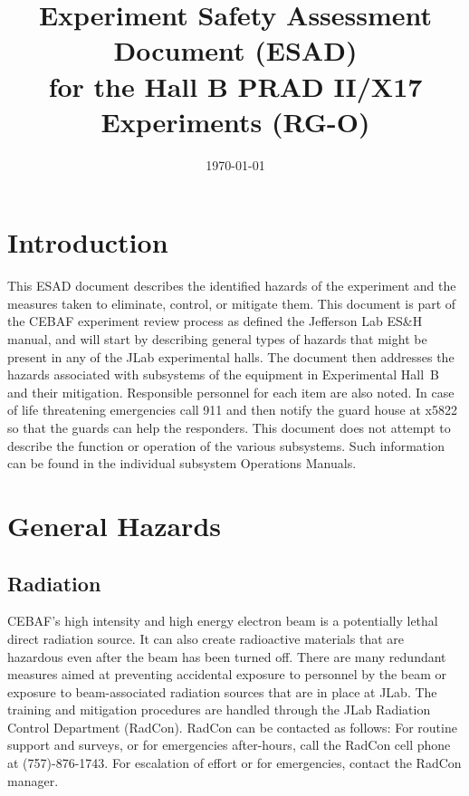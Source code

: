 \documentclass[12pt]{report}
\begin{document}
\title{Experiment Safety Assessment Document (ESAD) \\ 
  for the Hall B PRAD II/X17 Experiments (RG-O)}
\date{\today}
%
%
%
\maketitle
\tableofcontents

\chapter{Introduction}

This ESAD document describes the identified hazards of the experiment and the measures 
taken to eliminate, control, or mitigate them. This document is part of the CEBAF 
experiment review process as defined the Jefferson 
Lab ES\&H manual, and will start by describing general types of hazards that might be 
present in any of the JLab experimental halls.  The document then addresses the hazards 
associated with subsystems of the equipment in Experimental Hall~B and their mitigation.  
Responsible personnel for each item are also noted. In case of life threatening emergencies 
call 911 and then notify the guard house at x5822 so that the guards can help the 
responders.  This document does not attempt to describe the function or operation of the 
various subsystems. Such information can be found in the individual subsystem Operations 
Manuals.

\chapter{General Hazards}

\section{Radiation}
	
CEBAF's high intensity and high energy electron beam is a potentially lethal direct 
radiation source. It can also create radioactive materials that are hazardous even after 
the beam has been turned off. There are many redundant measures aimed at preventing 
accidental exposure to personnel by the beam or exposure to beam-associated radiation 
sources that are in place at JLab. The training and mitigation procedures are handled 
through the JLab Radiation Control Department (RadCon). RadCon can be contacted as follows: 
For routine support and surveys, or for emergencies after-hours, call the RadCon cell phone 
at (757)-876-1743. For escalation of effort or for emergencies, contact the RadCon manager.
\end{document}
